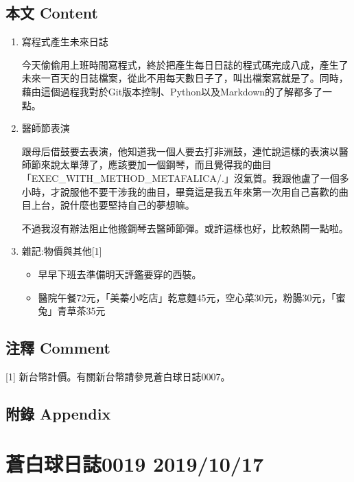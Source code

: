 \documentclass[
]{article}
\providecommand{\tightlist}{%
  \setlength{\itemsep}{0pt}\setlength{\parskip}{0pt}}
\begin{document}
\hypertarget{ux672cux6587-content-15}{%
\subsection{本文 Content}\label{ux672cux6587-content-15}}

\begin{enumerate}
\def\labelenumi{\arabic{enumi}.}
\item
  寫程式產生未來日誌

  今天偷偷用上班時間寫程式，終於把產生每日日誌的程式碼完成八成，產生了未來一百天的日誌檔案，從此不用每天數日子了，叫出檔案寫就是了。同時，藉由這個過程我對於Git版本控制、Python以及Markdown的了解都多了一點。
\item
  醫師節表演

  跟母后借鼓要去表演，他知道我一個人要去打非洲鼓，連忙說這樣的表演以醫師節來說太單薄了，應該要加一個鋼琴，而且覺得我的曲目「EXEC\_WITH\_METHOD\_METAFALICA/.」沒氣質。我跟他盧了一個多小時，才說服他不要干涉我的曲目，畢竟這是我五年來第一次用自己喜歡的曲目上台，說什麼也要堅持自己的夢想嘛。

  不過我沒有辦法阻止他搬鋼琴去醫師節彈。或許這樣也好，比較熱鬧一點啦。
\item
  雜記:物價與其他{[}1{]}

  \begin{itemize}
  \tightlist
  \item
    早早下班去準備明天評鑑要穿的西裝。
  \item
    醫院午餐72元，「美蓁小吃店」乾意麵45元，空心菜30元，粉腸30元，「蜜兔」青草茶35元
  \end{itemize}
\end{enumerate}

\hypertarget{ux6ce8ux91cb-comment-11}{%
\subsection{注釋 Comment}\label{ux6ce8ux91cb-comment-11}}

{[}1{]} 新台幣計價。有關新台幣請參見蒼白球日誌0007。

\hypertarget{ux9644ux9304-appendix-10}{%
\subsection{附錄 Appendix}\label{ux9644ux9304-appendix-10}}

\hypertarget{ux84bcux767dux7403ux65e5ux8a8c0019-20191017}{%
\section{蒼白球日誌0019
2019/10/17}\label{ux84bcux767dux7403ux65e5ux8a8c0019-20191017}}
\end{document}
